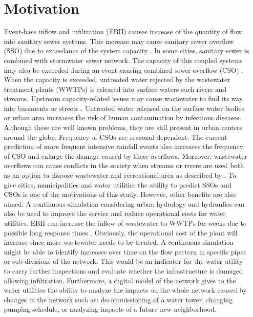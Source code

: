 \section{Motivation}
Event-base inflow and infiltration (EBII) causes increase of the quantity of flow into sanitary sewer systems. This increase may cause sanitary sewer overflow (SSO) due to exceedance of the system capacity  \cite{Rossman2016}. In some cities, sanitary sewer is combined with stormwater sewer network. The capacity of this coupled systems may also be exceeded during an event causing combined sewer overflow (CSO) \cite{Vallabhaneni2007}. When the capacity is exceeded, untreated water rejected by the wastewater treatment plants (WWTPs) is released into surface waters \cite{DeRodaHusman2016} such rivers and streams. Upstream capacity-related issues may cause wastewater to find its way into basements or streets \cite{Roesner2009}. Untreated water released on the surface water bodies or urban area increases the risk of human contamination by infectious diseases. 
Although these are well known problems, they are still present in urban centers around the globe. Frequency of CSOs are seasonal dependent. The current prediction of more frequent intensive rainfall events also increases the frequency of CSO \cite{DeRodaHusman2016} and enlarge the damage caused by these overflows. Moreover, wastewater overflows can cause conflicts in the society when streams or rivers are used both as an option to dispose wastewater and recreational area as described by \citet{heikkinen2016}. To give cities, municipalities and water utilities the ability to predict SSOs and CSOs is one of the motivations of this study. However, other benefits are also aimed. A continuous simulation considering urban hydrology and hydraulics can also be used to improve the service and reduce operational costs for water utilities. 
EBII can increase the inflow of wastewater to WWTPs for weeks due to possible long response times \cite{Mosley2001}. Obviously, the operational cost of the plant will increase since more wastewater needs to be treated. A continuous simulation might be able to identify increases over time on the flow pattern in specific pipes or sub-divisions of the network. This would be an indicator for the water utility to carry further inspections and evaluate whether the infrastructure is damaged allowing infiltration. Furthermore, a digital model of the network gives to the water utilities the ability to analyze the impacts on the whole network caused by changes in the network such as: decommissioning of a water tower, changing pumping schedule, or analyzing impacts of a future new neighborhood. 


